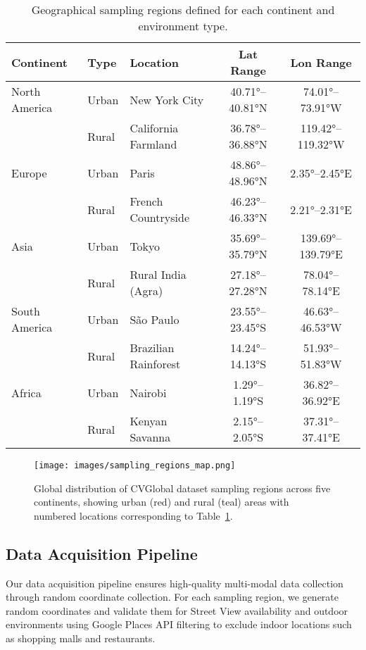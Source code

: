 \documentclass{bmvc2k}
\begin{document}
\begin{table}[t]
\centering
\caption{Geographical sampling regions defined for each continent and environment type.}
\label{tab:sampling_regions}
\begin{tabular}{lllcc}
\toprule
\textbf{Continent} & \textbf{Type} & \textbf{Location} & \textbf{Lat Range} & \textbf{Lon Range} \\
\midrule
North America & Urban & New York City & 40.71°--40.81°N & 74.01°--73.91°W \\
              & Rural & California Farmland & 36.78°--36.88°N & 119.42°--119.32°W \\
\midrule
Europe & Urban & Paris & 48.86°--48.96°N & 2.35°--2.45°E \\
       & Rural & French Countryside & 46.23°--46.33°N & 2.21°--2.31°E \\
\midrule
Asia & Urban & Tokyo & 35.69°--35.79°N & 139.69°--139.79°E \\
     & Rural & Rural India (Agra) & 27.18°--27.28°N & 78.04°--78.14°E \\
\midrule
South America & Urban & São Paulo & 23.55°--23.45°S & 46.63°--46.53°W \\
              & Rural & Brazilian Rainforest & 14.24°--14.13°S & 51.93°--51.83°W \\
\midrule
Africa & Urban & Nairobi & 1.29°--1.19°S & 36.82°--36.92°E \\
       & Rural & Kenyan Savanna & 2.15°--2.05°S & 37.31°--37.41°E \\
\bottomrule
\end{tabular}
\end{table}

\begin{figure}[t]
    \centering
    \texttt{[image: images/sampling\_regions\_map.png]}
    \caption{Global distribution of CVGlobal dataset sampling regions across five continents, showing urban (red) and rural (teal) areas with numbered locations corresponding to Table~\ref{tab:sampling_regions}.}
    \label{fig:sampling_regions}
\end{figure}

\subsection{Data Acquisition Pipeline}

Our data acquisition pipeline ensures high-quality multi-modal data collection through random coordinate collection. For each sampling region, we generate random coordinates and validate them for Street View availability and outdoor environments using Google Places API filtering to exclude indoor locations such as shopping malls and restaurants.
\end{document}

